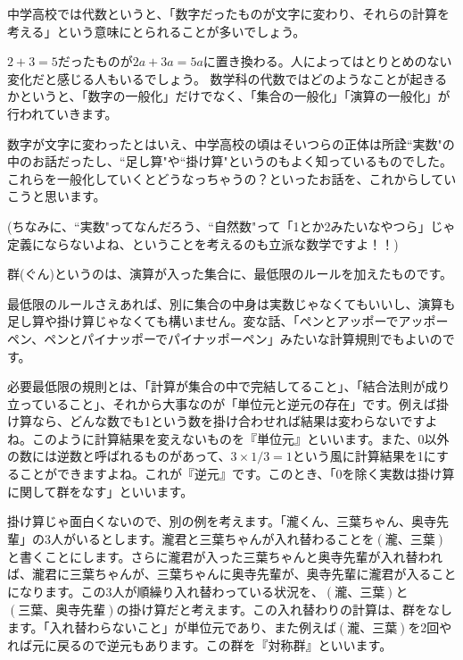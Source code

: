 中学高校では代数というと、「数字だったものが文字に変わり、それらの計算を考える」という意味にとられることが多いでしょう。

$2 + 3 = 5$だったものが$2a + 3a = 5a$に置き換わる。人によってはとりとめのない変化だと感じる人もいるでしょう。
数学科の代数ではどのようなことが起きるかというと、「数字の一般化」だけでなく、「集合の一般化」「演算の一般化」が行われていきます。

数字が文字に変わったとはいえ、中学高校の頃はそいつらの正体は所詮``実数"の中のお話だったし、``足し算"や``掛け算"というのもよく知っているものでした。これらを一般化していくとどうなっちゃうの？といったお話を、これからしていこうと思います。

(ちなみに、``実数"ってなんだろう、``自然数"って「1とか2みたいなやつら」じゃ定義にならないよね、ということを考えるのも立派な数学ですよ！！)

群(ぐん)というのは、演算が入った集合に、最低限のルールを加えたものです。

最低限のルールさえあれば、別に集合の中身は実数じゃなくてもいいし、演算も足し算や掛け算じゃなくても構いません。変な話、「ペンとアッポーでアッポーペン、ペンとパイナッポーでパイナッポーペン」みたいな計算規則でもよいのです。

必要最低限の規則とは、「計算が集合の中で完結してること」、「結合法則が成り立っていること」、それから大事なのが「単位元と逆元の存在」です。例えば掛け算なら、どんな数でも1という数を掛け合わせれば結果は変わらないですよね。このように計算結果を変えないものを『単位元』といいます。また、0以外の数には逆数と呼ばれるものがあって、$3 \times 1/3 = 1$という風に計算結果を1にすることができますよね。これが『逆元』です。このとき、「0を除く実数は掛け算に関して群をなす」といいます。

掛け算じゃ面白くないので、別の例を考えます。「瀧くん、三葉ちゃん、奥寺先輩」の3人がいるとします。瀧君と三葉ちゃんが入れ替わることを$(瀧、三葉)$と書くことにします。さらに瀧君が入った三葉ちゃんと奥寺先輩が入れ替われば、瀧君に三葉ちゃんが、三葉ちゃんに奥寺先輩が、奥寺先輩に瀧君が入ることになります。この3人が順繰り入れ替わっている状況を、$(瀧、三葉)$と$(三葉、奥寺先輩)$の掛け算だと考えます。この入れ替わりの計算は、群をなします。「入れ替わらないこと」が単位元であり、また例えば$(瀧、三葉)$を2回やれば元に戻るので逆元もあります。この群を『対称群』といいます。

